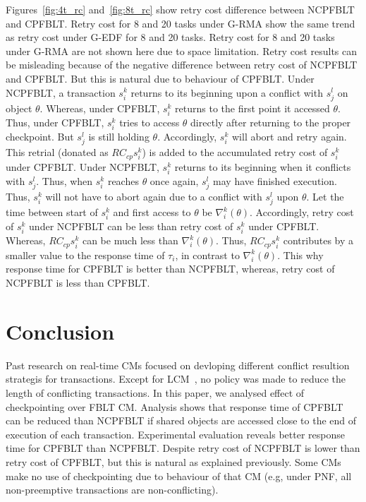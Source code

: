 \documentclass[conference]{IEEEtran}
\begin{document}
Figures~\ref{fig:4t_rc} and~\ref{fig:8t_rc} show retry cost difference between NCPFBLT and CPFBLT. Retry cost for 8 and 20 tasks under G-RMA show the same trend as retry cost under G-EDF for 8 and 20 tasks. Retry cost for 8 and 20 tasks under G-RMA are not shown here due to space limitation. Retry cost results can be misleading because of the negative difference between retry cost of NCPFBLT and CPFBLT. But this is natural due to behaviour of CPFBLT. Under NCPFBLT, a transaction $s_i^k$ returns to its beginning upon a conflict with $s_j^l$ on object $\theta$. Whereas, under CPFBLT, $s_i^k$ returns to the first point it accessed $\theta$. Thus, under CPFBLT, $s_i^k$ tries to access $\theta$ directly after returning to the proper checkpoint. But $s_j^l$ is still holding $\theta$. Accordingly, $s_i^k$ will abort and retry again. This retrial (donated as $RC_{cp}s_i^k$) is added to the accumulated retry cost of $s_i^k$ under CPFBLT. Under NCPFBLT, $s_i^k$ returns to its beginning when it conflicts with $s_j^l$. Thus, when $s_i^k$ reaches $\theta$ once again, $s_j^l$ may have finished execution. Thus, $s_i^k$ will not have to abort again due to a conflict with $s_j^l$ upon $\theta$. Let the time between start of $s_i^k$ and first access to $\theta$ be $\nabla_i^k(\theta)$. Accordingly, retry cost of $s_i^k$ under NCPFBLT can be less than retry cost of $s_i^k$ under CPFBLT. Whereas, $RC_{cp}s_i^k$ can be much less than $\nabla_i^k(\theta)$. Thus, $RC_{cp}s_i^k$ contributes by a smaller value to the response time of $\tau_i$, in contrast to $\nabla_i^k(\theta)$. This why response time for CPFBLT is better than NCPFBLT, whereas, retry cost of NCPFBLT is less than CPFBLT.
%
\section{Conclusion}\label{sec:conclusion}
%
Past research on real-time CMs focused on devloping different conflict resultion strategis for transactions. Except for LCM~\cite{lcmdac2012}, no policy was made to reduce the length of conflicting transactions. In this paper, we analysed effect of checkpointing over FBLT CM. Analysis shows that response time of CPFBLT can be reduced than NCPFBLT if shared objects are accessed close to the end of execution of each transaction. Experimental evaluation reveals better response time for CPFBLT than NCPFBLT. Despite retry cost of NCPFBLT is lower than retry cost of CPFBLT, but this is natural as explained previously. Some CMs make no use of checkpointing due to behaviour of that CM (e.g, under PNF, all non-preemptive transactions are non-conflicting).
\end{document}
